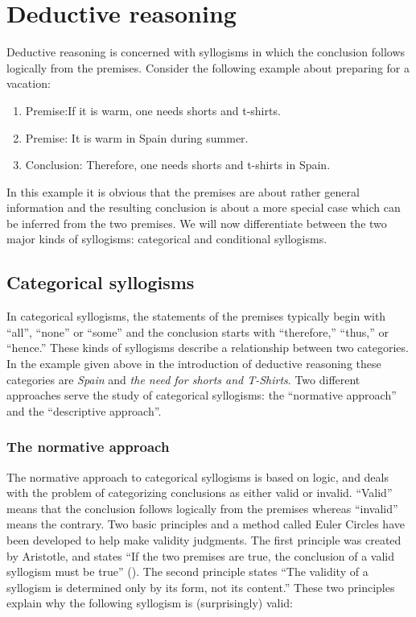 \documentclass[
]{krantz}
\providecommand{\tightlist}{%
  \setlength{\itemsep}{0pt}\setlength{\parskip}{0pt}}
\begin{document}
\section{Deductive reasoning}\label{deductive-reasoning}

Deductive reasoning is concerned with syllogisms in which the conclusion follows logically from the premises. Consider the following example about preparing for a vacation:

\begin{enumerate}
\def\labelenumi{\arabic{enumi}.}
\tightlist
\item
  Premise:If it is warm, one needs shorts and t-shirts.
\item
  Premise: It is warm in Spain during summer.
\item
  Conclusion: Therefore, one needs shorts and t-shirts in Spain.
\end{enumerate}

In this example it is obvious that the premises are about rather general information and the resulting conclusion is about a more special case which can be inferred from the two premises. We will now differentiate between the two major kinds of syllogisms: categorical and conditional syllogisms.

\subsection*{Categorical syllogisms}\label{categorical-syllogisms}


In categorical syllogisms, the statements of the premises typically begin with ``all'', ``none'' or ``some'' and the conclusion starts with ``therefore,'' ``thus,'' or ``hence.'' These kinds of syllogisms describe a relationship between two categories. In the example given above in the introduction of deductive reasoning these categories are \emph{Spain} and \emph{the need for shorts and T-Shirts}. Two different approaches serve the study of categorical syllogisms: the ``normative approach'' and the ``descriptive approach''.

\subsubsection*{The normative approach}\label{the-normative-approach}


The normative approach to categorical syllogisms is based on logic, and deals with the problem of categorizing conclusions as either valid or invalid. ``Valid'' means that the conclusion follows logically from the premises whereas ``invalid'' means the contrary. Two basic principles and a method called Euler Circles have been developed to help make validity judgments. The first principle was created by Aristotle, and states ``If the two premises are true, the conclusion of a valid syllogism must be true'' (). The second principle states ``The validity of a syllogism is determined only by its form, not its content.'' These two principles explain why the following syllogism is (surprisingly) valid:
\end{document}
